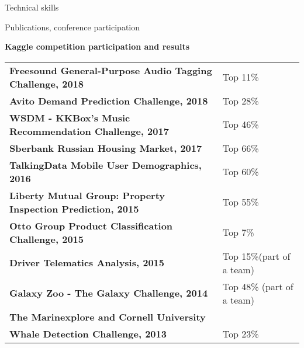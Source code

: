 \documentclass{resume} %
\begin{document}
\begin{rSection}{Technical skills}
\begin{rSection}{Publications, conference participation}
\end{rSection}

\pagebreak

{\bf Kaggle competition participation and results}

\begin{tabular}{ @{} >{\bfseries}l @{\hspace{6ex}} l }
Freesound General-Purpose Audio Tagging Challenge, 2018 & Top 11\% \\
Avito Demand Prediction Challenge, 2018 & Top 28\% \\
WSDM - KKBox's Music Recommendation Challenge, 2017 & Top 46\% \\
Sberbank Russian Housing Market, 2017 & Top 66\% \\
TalkingData Mobile User Demographics, 2016 & Top 60\% \\
Liberty Mutual Group: Property Inspection Prediction, 2015 & Top 55\% \\
Otto Group Product Classification Challenge, 2015 & Top 7\% \\ 
Driver Telematics Analysis, 2015 & Top 15\%(part of a team) \\ 
Galaxy Zoo - The Galaxy Challenge, 2014 & Top 48\% (part of a team) \\
The Marinexplore and Cornell University & \\
Whale Detection Challenge, 2013 & Top 23\%
\end{tabular}


\end{rSection}


\end{document}
